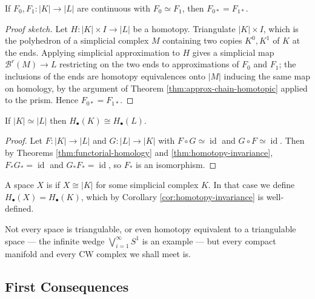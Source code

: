 \documentclass[a4paper]{scrartcl}
\newcommand{\id}{\operatorname{id}}
\newcommand{\bary}{\mathcal{B}}
\begin{document}
\begin{theorem} \label{thm:homotopy-invariance}
	If $F_0, F_1: |K|\to|L|$ are continuous with $F_0 \simeq F_1$, then $F_{0*} = F_{1*}$.
\end{theorem}
\begin{proof}[Proof sketch]
	Let $H: |K|\times I \to |L|$ be a homotopy. Triangulate $|K|\times I$, which is the polyhedron of a simplicial complex $M$ containing two copies $K^0, K^1$ of $K$ at the ends. Applying simplicial approximation to $H$ gives a simplicial map $\bary^r(M)\to L$ restricting on the two ends to approximations of $F_0$ and $F_1$; the inclusions of the ends are homotopy equivalences onto $|M|$ inducing the same map on homology, by the argument of Theorem \ref{thm:approx-chain-homotopic} applied to the prism. Hence $F_{0*} = F_{1*}$.
\end{proof}

\begin{corollary} \label{cor:homotopy-invariance}
	If $|K| \simeq |L|$ then $H_\bullet(K)\cong H_\bullet(L)$.
\end{corollary}
\begin{proof}
	Let $F: |K|\to|L|$ and $G: |L|\to|K|$ with $F\circ G \simeq \id$ and $G \circ F \simeq \id$. Then by Theorems \ref{thm:functorial-homology} and \ref{thm:homotopy-invariance}, $F_*G_* = \id$ and $G_*F_* = \id$, so $F_*$ is an isomorphism.
\end{proof}

\begin{definition}
	A space $X$ is  if $X \cong |K|$ for some simplicial complex $K$. In that case we define $H_\bullet(X) = H_\bullet(K)$, which by Corollary \ref{cor:homotopy-invariance} is well-defined.
\end{definition}

Not every space is triangulable, or even homotopy equivalent to a triangulable space --- the
infinite wedge $\bigvee_{i=1}^\infty S^1$ is an example --- but every compact manifold and
every CW complex we shall meet is.

\subsection{First Consequences}
\end{document}
